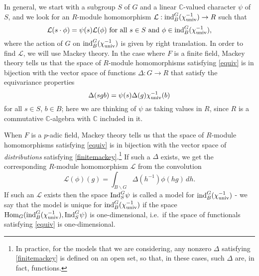 \documentclass[11pt,letterpaper]{article}
\newcommand{\C}{\mathbb{C}}
\newcommand{\calL}{\mathcal{L}} %
\newcommand{\calH}{\mathcal{H}} %
\newcommand{\ve}{\varepsilon}
\newcommand{\bs}{\backslash}
\newcommand{\SO}{\textup{SO}}
\newcommand{\calHom}{\textup{Hom}}
\newcommand{\Ind}{\textup{Ind}}
\newcommand{\ind}{\textup{ind}}
\theoremstyle{remark}
\numberwithin{equation}{section}
\begin{document}

In general, we start with a subgroup $S$ of $G$ and a linear $\C$-valued character $\psi$ of $S$, and we look for an $R$-module homomorphism $\calL: \ind_B^G(\chi_{\textup{univ}}^{-1}) \to R$ such that \begin{equation}\label{equiv} \calL(s \cdot \phi) = \psi(s)\calL(\phi) \textup{ for all $s \in S$ and $\phi \in \ind_B^G(\chi_{\textup{univ}}^{-1})$,}\end{equation} where the action of $G$ on $\ind_B^G(\chi_{\textup{univ}}^{-1})$ is given by right translation. In order to find $\calL$, we will use Mackey theory. In the case where $F$ is a finite field, Mackey theory tells us that the space of $R$-module homomorphisms satisfying \eqref{equiv} is in bijection with the vector space of functions $\Delta: G \to R$ that satisfy the equivariance properties \begin{equation}\label{finitemackey} \Delta(sgb) = \psi(s)\Delta(g)\chi_{\textup{univ}}^{-1}(b) \end{equation} for all $s \in S$, $b \in B$; here we are thinking of $\psi$ as taking values in $R$, since $R$ is a commutative $\C$-algebra with $\C$ included in it. 

When $F$ is a $p$-adic field, Mackey theory tells us that the space of $R$-module homomorphisms satisfying \eqref{equiv} is in bijection with the vector space of \emph{distributions} satisfying \eqref{finitemackey}.\footnote{In practice, for the models that we are considering, any nonzero $\Delta$ satisfying \eqref{finitemackey} is defined on an open set, so that, in these cases, such $\Delta$ are, in fact, functions.} If such a $\Delta$ exists, we get the corresponding $R$-module homomorphism $\calL$ from the convolution $$\calL(\phi)(g) = \int_{B \bs G} \Delta(h^{-1})\phi(hg)\,dh.$$ If such an $\calL$ exists then the space $\Ind_S^G \psi$ is called a model for $\ind_B^G(\chi_{\textup{univ}}^{-1})$ - we say that the model is unique for $\ind_B^G(\chi_{\textup{univ}}^{-1})$ if the space $\calHom_G( \ind_B^G( \chi_{\textup{univ}}^{-1}), \Ind_S^G \psi)$ is one-dimensional, i.e.~if the space of functionals satisfying \eqref{equiv} is one-dimensional.
\end{document}
